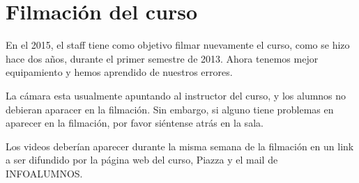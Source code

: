 \documentclass[11pt]{article}
\begin{document}
\section{Filmaci\'on del curso}
\label{sec:recording}

En el 2015, el staff tiene como objetivo filmar nuevamente el curso,
como se hizo hace dos a\~nos, durante el primer semestre de 2013. Ahora
tenemos mejor equipamiento y hemos aprendido de nuestros errores.

La c\'amara esta usualmente apuntando al instructor del curso, y los
alumnos no debieran aparacer en la filmaci\'on. Sin embargo, si alguno
tiene problemas en aparecer en la filmaci\'on, por favor si\'entense atr\'as
en la sala.

Los videos deber\'ian aparecer durante la misma semana de la filmaci\'on
en un link a ser difundido por la p\'agina web del curso, Piazza y el
mail de INFOALUMNOS.





\end{document}

